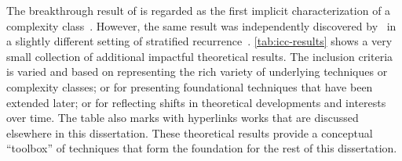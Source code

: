 The breakthrough result of  is regarded as the first
implicit characterization of a complexity class~\cite{dallago2011,kristiansen2017,rubiano17}. However, the same result
was independently discovered by~\textcite{leivant1993} in a slightly different
setting of stratified recurrence~\cite[p.
762]{dallago2022}. \autoref{tab:icc-results} shows a {very small} collection of
additional impactful theoretical results. The inclusion criteria is varied and
based on representing the rich variety of underlying techniques or complexity
classes; or for presenting foundational techniques
that have been extended later; or for reflecting shifts in theoretical
developments and interests over time. The table also marks with hyperlinks works
that are discussed elsewhere in this dissertation. These theoretical results
provide a conceptual \enquote{toolbox} of techniques that form the foundation
for the rest of this dissertation.

